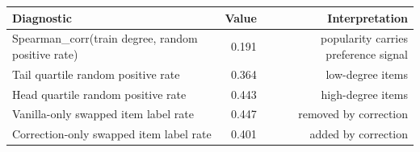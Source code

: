\begin{tabular}{lrr}\toprule
Diagnostic & Value & Interpretation \\\midrule
Spearman_corr(train degree, random positive rate) & 0.191 & popularity carries preference signal \\
Tail quartile random positive rate & 0.364 & low-degree items \\
Head quartile random positive rate & 0.443 & high-degree items \\
Vanilla-only swapped item label rate & 0.447 & removed by correction \\
Correction-only swapped item label rate & 0.401 & added by correction \\
\bottomrule\end{tabular}
